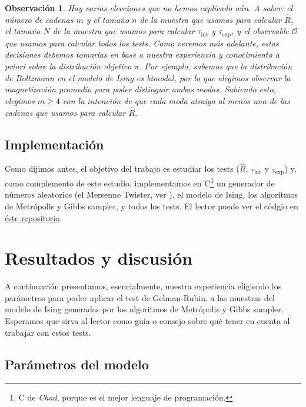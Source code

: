 \documentclass[a4paper, 12pt]{article}
\newtheorem*{observacion}{Observación}
\newcommand{\tauint}{\tau_\text{int}}
\newcommand{\tauexp}{\tau_\text{exp}}
\begin{document}
\begin{observacion}
    Hay varias elecciones que no hemos explicado aún. A saber: el número de cadenas $m$ y el tamaño $n$ de la muestra que usamos para calcular $\hat{R}$, el tamaño $N$ de la muestra que usamos para calcular $\tauint$ y $\tauexp$, y el observable $\mathcal{O}$ que usamos para calcular todos los tests. Como veremos más adelante, estas decisiones debemos tomarlas en base a nuestra experiencia y conocimiento a priori sobre la distribución objetivo $\pi$. Por ejemplo, sabemos que la distribución de Boltzmann en el modelo de Ising es bimodal, por lo que elegimos observar la magnetización promedio para poder distinguir ambas modas. Sabiendo esto, elegimos $m \geq 4$ con la intención de que cada moda atraiga al menos una de las cadenas que usamos para calcular $\hat{R}$.
\end{observacion}

\subsection{Implementación}

Como dijimos antes, el objetivo del trabajo es estudiar los tests ($\hat{R}$, $\tauint$ y $\tauexp$) y, como complemento de este estudio, implementamos en C\footnote{C de {\it Chad}, porque es el mejor lenguaje de programación.} un generador de números aleatorios (el Mersenne Twister, ver \cite{matsumoto1998mersenne}), el modelo de Ising, los algoritmos de Metrópolis y Gibbs sampler, y todos los tests. El lector puede ver el códgio en \href{https://github.com/santigiordani/fiscomp-final.git}{éste repositorio}.

\section{Resultados y discusión}

A continuación presentamos, esencialmente, nuestra experiencia eligiendo los parámetros para poder aplicar el test de Gelman-Rubin, a las muestras del modelo de Ising generadas por los algoritmos de Metrópolis y Gibbs sampler. Esperamos que sirva al lector como guía o consejo sobre qué tener en cuenta al trabajar con estos tests.

\subsection{Parámetros del modelo}
\end{document}
